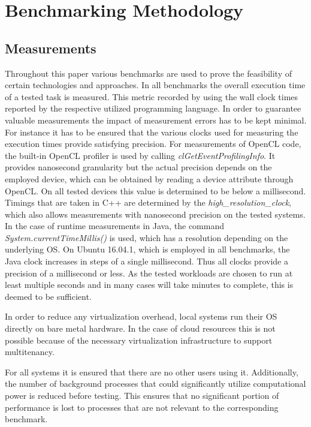 \chapter{Benchmarking Methodology}
\label{benchmarking_methodology}
\section{Measurements}

Throughout this paper various benchmarks are used to prove the feasibility of certain technologies and approaches. In all benchmarks the overall execution time of a tested task is measured. This metric recorded by using the wall clock times reported by the respective utilized programming language. In order to guarantee valuable measurements the impact of measurement errors has to be kept minimal. For instance it has to be ensured that the various clocks used for measuring the execution times provide satisfying precision. For measurements of OpenCL code, the built-in OpenCL profiler is used by calling \textit{clGetEventProfilingInfo}. It provides nanosecond granularity but the actual precision depends on the employed device\cite{cl_profiling}, which can be obtained by reading a device attribute through OpenCL. On all tested devices this value is determined to be below a millisecond. Timings that are taken in C++ are determined by the \textit{high\_resolution\_clock}, which also allows measurements with nanosecond precision on the tested systems. In the case of runtime measurements in Java, the command \textit{System.currentTimeMillis()} is used, which has a resolution depending on the underlying OS\cite{oracle_system}. On Ubuntu 16.04.1, which is employed in all benchmarks, the Java clock increases in steps of a single millisecond. Thus all clocks provide a precision of a millisecond or less. As the tested workloads are chosen to run at least multiple seconds and in many cases will take minutes to complete, this is deemed to be sufficient.

In order to reduce any virtualization overhead, local systems run their OS directly on bare metal hardware. In the case of cloud resources this is not possible because of the necessary virtualization infrastructure to support multitenancy.

For all systems it is ensured that there are no other users using it. Additionally, the number of background processes that could significantly utilize computational power is reduced before testing. This ensures that no significant portion of performance is lost to processes that are not relevant to the corresponding benchmark.

